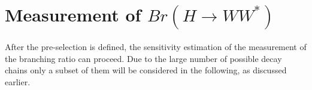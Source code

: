 \documentclass[11pt,a4paper]{cepcnote}
\begin{document}

\section{Measurement of $Br(H\rightarrow WW^*)$}
After the pre-selection is defined, the sensitivity estimation of
the measurement of the branching ratio can proceed. Due to the large number 
of possible decay chains only a subset of them will be considered in the
following, as discussed earlier.
\end{document}
